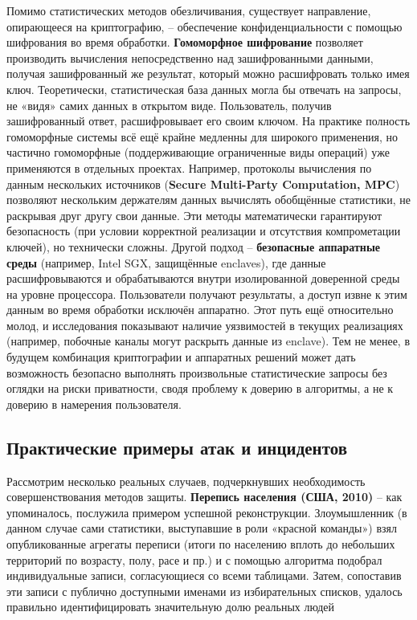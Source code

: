 Помимо статистических методов обезличивания, существует направление, опирающееся на криптографию, – обеспечение конфиденциальности с помощью шифрования во время обработки. \textbf{Гомоморфное шифрование} позволяет производить вычисления непосредственно над зашифрованными данными, получая зашифрованный же результат, который можно расшифровать только имея ключ. Теоретически, статистическая база данных могла бы отвечать на запросы, не «видя» самих данных в открытом виде. Пользователь, получив зашифрованный ответ, расшифровывает его своим ключом. На практике полность гомоморфные системы всё ещё крайне медленны для широкого применения, но частично гомоморфные (поддерживающие ограниченные виды операций) уже применяются в отдельных проектах. Например, протоколы вычисления по данным нескольких источников (\textbf{Secure Multi-Party Computation, MPC}) позволяют нескольким держателям данных вычислять обобщённые статистики, не раскрывая друг другу свои данные. Эти методы математически гарантируют безопасность (при условии корректной реализации и отсутствия компрометации ключей), но технически сложны. Другой подход – \textbf{безопасные аппаратные среды} (например, Intel SGX, защищённые enclaves), где данные расшифровываются и обрабатываются внутри изолированной доверенной среды на уровне процессора. Пользователи получают результаты, а доступ извне к этим данным во время обработки исключён аппаратно. Этот путь ещё относительно молод, и исследования показывают наличие уязвимостей в текущих реализациях (например, побочные каналы могут раскрыть данные из enclave). Тем не менее, в будущем комбинация криптографии и аппаратных решений может дать возможность безопасно выполнять произвольные статистические запросы без оглядки на риски приватности, сводя проблему к доверию в алгоритмы, а не к доверию в намерения пользователя. \subsection{Практические примеры атак и инцидентов}
Рассмотрим несколько реальных случаев, подчеркнувших необходимость совершенствования методов защиты. \textbf{Перепись населения (США, 2010)} – как упоминалось, послужила примером успешной реконструкции. Злоумышленник (в данном случае сами статистики, выступавшие в роли «красной команды») взял опубликованные агрегаты переписи (итоги по населению вплоть до небольших территорий по возрасту, полу, расе и пр.) и с помощью алгоритма подобрал индивидуальные записи, согласующиеся со всеми таблицами. Затем, сопоставив эти записи с публично доступными именами из избирательных списков, удалось правильно идентифицировать значительную долю реальных людей

